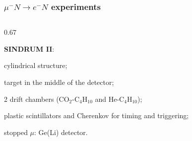 \documentclass{beamer}
\begin{document}
    \begin{frame}
        \frametitle{$ \mu^- N \rightarrow e^- N $ experiments}
        \vspace{-3mm}
\begin{columns}
 \begin{column}{0.67\framewidth}
 \setlength{\leftmargini}{1.1em}

    \begin{itemize}

        {\small    
   
   \item \textbf{SINDRUM II}: }

\begin{itemize}
    {\small  
    \item cylindrical structure;
    \item target in the middle of the detector;
    \item 2 drift chambers (CO$_2$-C$_4$H$_10$ and He-C$_4$H$_10$); 
    \item plastic scintillators and Cherenkov for timing and triggering;
    \item stopped $\mu$: Ge(Li) detector.
    }
\end{itemize}


   {\small    
   
}
\end{itemize}
\end{column}
\end{columns}
\end{frame}
\end{document}
